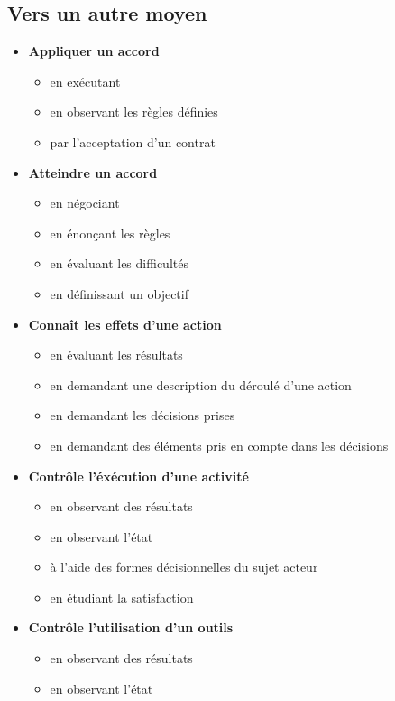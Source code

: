 \documentclass[8pt,a4paper]{article}
\begin{document}
\subsection{Vers un autre moyen}
\begin{itemize}
\item \textbf{Appliquer un accord}
\begin{itemize}
\item en exécutant
\item en observant les règles définies
\item par l'acceptation d'un contrat
\\ 
 \end{itemize}
\item \textbf{Atteindre un accord}
\begin{itemize}
\item en négociant
\item en énonçant les règles
\item en évaluant les difficultés
\item en définissant un objectif
\\ 
 \end{itemize}
\item \textbf{Connaît les effets d'une action}
\begin{itemize}
\item en évaluant les résultats
\item en demandant une description du déroulé d'une action
\item en demandant les décisions prises
\item en demandant des éléments pris en compte dans les décisions
\\ 
 \end{itemize}
\item \textbf{Contrôle l'éxécution d'une activité}
\begin{itemize}
\item en observant des résultats
\item en observant l'état
\item à l'aide des formes décisionnelles du sujet acteur
\item en étudiant la satisfaction
\\ 
 \end{itemize}
\item \textbf{Contrôle l'utilisation d'un outils}
\begin{itemize}
\item en observant des résultats
\item en observant l'état

\end{itemize}
\end{itemize}
\end{document}
